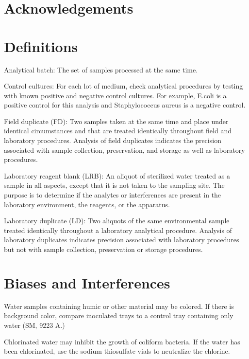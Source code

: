 \documentclass[12pt]{../SOP4_alpha}\usepackage[]{graphicx}\usepackage[]{xcolor}
\begin{document}
\tableofcontents

\newpage

\section{Acknowledgements}

\section{Definitions}

\NP Analytical batch: The set of samples processed at the same time. 

\NP Control cultures: For each lot of medium, check analytical procedures by
testing with known positive and negative control cultures. For example,
E.coli is a positive control for this analysis and Staphylococcus aureus is a
negative control.

\NP Field duplicate (FD): Two samples taken at the same time and place under
identical circumstances and that are treated identically throughout field
and laboratory procedures. Analysis of field duplicates indicates the
precision associated with sample collection, preservation, and storage as
well as laboratory procedures.

\NP Laboratory reagent blank (LRB): An aliquot of sterilized water treated as a
sample in all aspects, except that it is not taken to the sampling site. The
purpose is to determine if the analytes or interferences are present in the
laboratory environment, the reagents, or the apparatus.

\NP Laboratory duplicate (LD): Two aliquots of the same environmental sample
treated identically throughout a laboratory analytical procedure. Analysis
of laboratory duplicates indicates precision associated with laboratory
procedures but not with sample collection, preservation or storage
procedures. 


\section{Biases and Interferences}
\NP Water samples containing humic or other material may be colored. If there is
background color, compare inoculated trays to a control tray containing only
water (SM, 9223 A.) 

\NP Chlorinated water may inhibit the growth of coliform bacteria. If the water has been 
chlorinated, use the sodium thiosulfate vials to neutralize the chlorine.
\end{document}
